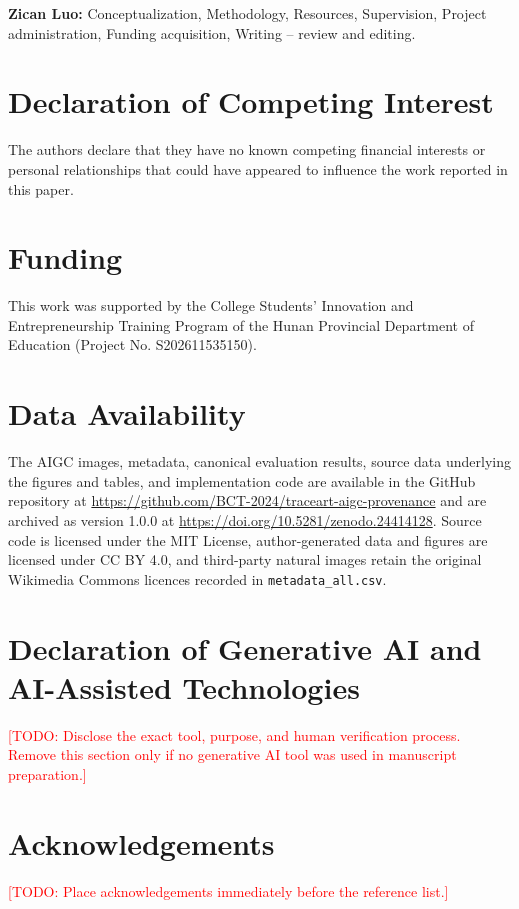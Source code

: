 \documentclass[a4paper,fleqn]{cas-sc}
\newcommand{\todo}[1]{\textcolor{red}{[TODO: #1]}}
\begin{document}
\textbf{Zican Luo:} Conceptualization, Methodology, Resources, Supervision,
Project administration, Funding acquisition, Writing -- review and editing.

\section*{Declaration of Competing Interest}
The authors declare that they have no known competing financial interests or
personal relationships that could have appeared to influence the work reported
in this paper.

\section*{Funding}
This work was supported by the College Students' Innovation and
Entrepreneurship Training Program of the Hunan Provincial Department of
Education (Project No. S202611535150).

\section*{Data Availability}
The AIGC images, metadata, canonical evaluation results, source data underlying
the figures and tables, and implementation code are available in the GitHub
repository at
\url{https://github.com/BCT-2024/traceart-aigc-provenance} and are archived as
version 1.0.0 at \url{https://doi.org/10.5281/zenodo.24414128}. Source code is
licensed under the MIT License, author-generated data and figures are licensed
under CC BY 4.0, and third-party natural images retain the original Wikimedia
Commons licences recorded in \texttt{metadata\_all.csv}.

\section*{Declaration of Generative AI and AI-Assisted Technologies}
\todo{Disclose the exact tool, purpose, and human verification process. Remove
this section only if no generative AI tool was used in manuscript preparation.}

\section*{Acknowledgements}
\todo{Place acknowledgements immediately before the reference list.}

\printcredits



\end{document}
